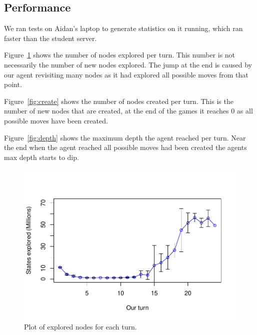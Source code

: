 \documentclass[12pt]{article}
\begin{document}
\subsection*{Performance}
We ran tests on Aidan's laptop to generate statistics on it running, which ran faster than the student server.

Figure~\ref{fig:explore} shows the number of nodes explored per turn.
This number is not necessarily the number of new nodes explored.
The jump at the end is caused by our agent revisiting many nodes as it had explored all possible moves from that point.

Figure~\ref{fig:create} shows the number of nodes created per turn.
This is the number of new nodes that are created, at the end of the games it reaches 0 as all possible moves have been created.

Figure~\ref{fig:depth} shows the maximum depth the agent reached per turn.
Near the end when the agent reached all possible moves had been created the agents max depth starts to dip.

\begin{figure}
  \centering
  \includegraphics[scale=0.5]{../results/explored_plot.pdf}
  \caption{Plot of explored nodes for each turn.}
  \label{fig:explore}
\end{figure}
\end{document}
